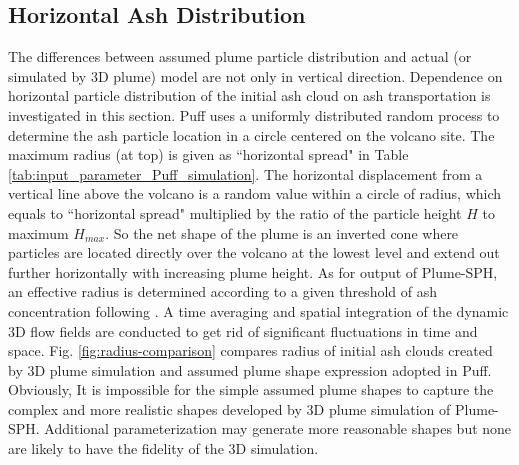 \documentclass[draft,linenumbers]{agujournal2019}
\begin{document}
\subsection{Horizontal Ash Distribution}

The differences between assumed plume particle distribution and actual (or simulated by 3D plume) model are not only in vertical direction. Dependence on horizontal particle distribution of the initial ash cloud on ash transportation is investigated in this section. Puff uses a uniformly distributed random process to determine the ash particle location in a circle centered on the volcano site. The maximum radius (at top) is given as ``horizontal spread" in Table \ref{tab:input_parameter_Puff_simulation}. The horizontal displacement from a vertical line above the volcano is a random value within a circle of radius, which equals to ``horizontal spread" multiplied by the ratio of the particle height $H$ to maximum $H_{max}$. So the net shape of the plume is an inverted cone where particles are located directly over the volcano at the lowest level and extend out further horizontally with increasing plume height. As for output of Plume-SPH, an effective radius is determined according to a given threshold of ash concentration following \citet {cerminara2016large}. A time averaging and spatial integration of the dynamic 3D flow fields are conducted to get rid of significant fluctuations in time and space. Fig. \ref{fig:radius-comparison} compares radius of initial ash clouds created by 3D plume simulation and assumed plume shape expression adopted in Puff. Obviously, It is impossible for the simple assumed plume shapes to capture the complex and more realistic shapes developed by 3D plume simulation of Plume-SPH. Additional parameterization may generate more reasonable shapes but none are likely to have the fidelity of the 3D simulation.

\end{document}
